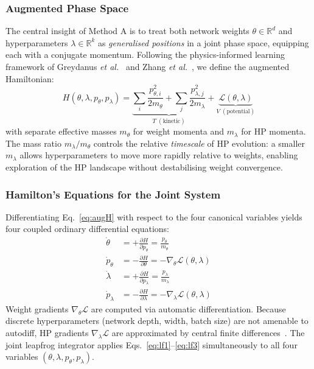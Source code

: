 \documentclass[11pt]{article}
\begin{document}
\subsubsection{Augmented Phase Space}

The central insight of Method A is to treat both network weights
$\theta \in \mathbb{R}^d$ and hyperparameters
$\lambda \in \mathbb{R}^k$ as \emph{generalised positions} in a joint
phase space, equipping each with a conjugate momentum.  Following the
physics-informed learning framework of Greydanus
\emph{et al.}~\cite{greydanus2019} and Zhang \emph{et al.}~\cite{zhang2025},
we define the augmented Hamiltonian:
\begin{equation}
H(\theta,\lambda,p_\theta,p_\lambda)
  = \underbrace{\sum_i\frac{p_{\theta,i}^2}{2m_\theta}
    + \sum_j\frac{p_{\lambda,j}^2}{2m_\lambda}}_{T\;(\text{kinetic})}
  + \underbrace{\mathcal{L}(\theta,\lambda)}_{V\;(\text{potential})}
\label{eq:augH}
\end{equation}
with separate effective masses $m_\theta$ for weight momenta and
$m_\lambda$ for HP momenta.  The mass ratio $m_\lambda / m_\theta$
controls the relative \emph{timescale} of HP evolution: a smaller
$m_\lambda$ allows hyperparameters to move more rapidly relative to
weights, enabling exploration of the HP landscape without destabilising
weight convergence.

\subsubsection{Hamilton's Equations for the Joint System}

Differentiating Eq.~\eqref{eq:augH} with respect to the four
canonical variables yields four coupled ordinary differential
equations:
\begin{align}
\dot\theta      &= +\frac{\partial H}{\partial p_\theta}
                 = \frac{p_\theta}{m_\theta}
\label{eq:heq1}\\
\dot{p}_\theta  &= -\frac{\partial H}{\partial \theta}
                 = -\nabla_\theta\mathcal{L}(\theta,\lambda)
\label{eq:heq2}\\
\dot\lambda     &= +\frac{\partial H}{\partial p_\lambda}
                 = \frac{p_\lambda}{m_\lambda}
\label{eq:heq3}\\
\dot{p}_\lambda &= -\frac{\partial H}{\partial \lambda}
                 = -\nabla_\lambda\mathcal{L}(\theta,\lambda)
\label{eq:heq4}
\end{align}
Weight gradients $\nabla_\theta\mathcal{L}$ are computed via
automatic differentiation.  Because discrete hyperparameters (network
depth, width, batch size) are not amenable to autodiff, HP gradients
$\nabla_\lambda\mathcal{L}$ are approximated by central finite
differences~\cite{rathore2024}.  The joint leapfrog integrator applies
Eqs.~\eqref{eq:lf1}--\eqref{eq:lf3} simultaneously to all four
variables $(\theta, \lambda, p_\theta, p_\lambda)$.
\end{document}
